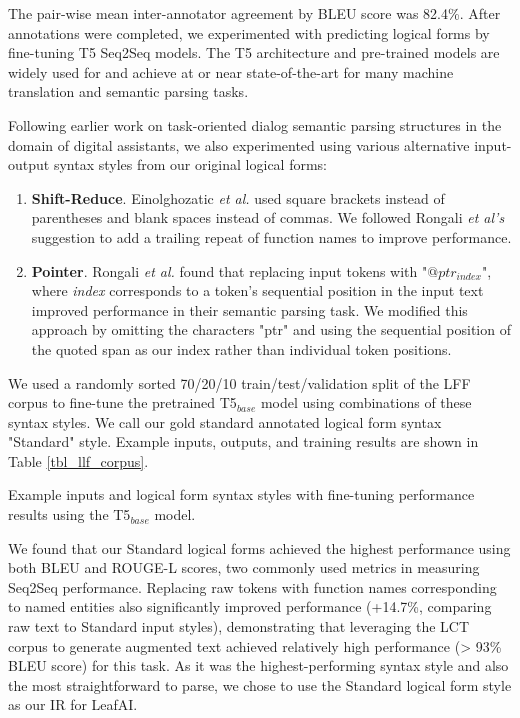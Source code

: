 \documentclass[../main.tex]{subfiles}
\begin{document}
The pair-wise mean inter-annotator agreement by BLEU score was 82.4\%. After annotations were completed, we experimented with predicting logical forms by fine-tuning T5 \cite{raffel2020exploring} Seq2Seq models. The T5 architecture and pre-trained models are widely used for and achieve at or near state-of-the-art for many machine translation and semantic parsing tasks. 

Following earlier work on task-oriented dialog semantic parsing structures in the domain of digital assistants, we also experimented using various alternative input-output syntax styles from our original logical forms:

\begin{enumerate}
    \item \textbf{Shift-Reduce}. Einolghozatic \textit{et al.} \cite{einolghozati2019improving} used square brackets instead of parentheses and blank spaces instead of commas. We followed Rongali \textit{et al's} suggestion to add a trailing repeat of function names to improve performance.
    \item \textbf{Pointer}. Rongali \textit{et al.} \cite{rongali2020don} found that replacing input tokens with "$@ptr_{index}$", where \textit{index} corresponds to a token's sequential position in the input text improved performance in their semantic parsing task. We modified this approach by omitting the characters "ptr" and using the sequential position of the quoted span as our index rather than individual token positions.
\end{enumerate}

We used a randomly sorted 70/20/10 train/test/validation split of the LFF corpus to fine-tune the pretrained T5$_{base}$ model using combinations of these syntax styles. We call our gold standard annotated logical form syntax "Standard" style. Example inputs, outputs, and training results are shown in Table \ref{tbl_llf_corpus}. 

\begin{table}[t!]
    \footnotesize
    \centering
    
    \caption{Example inputs and logical form syntax styles with fine-tuning performance results using the T5$_{base}$ model.}
    \label{tbl_llf_corpus}
\end{table} 

We found that our Standard logical forms achieved the highest performance using both BLEU \cite{lin2004rouge} and ROUGE-L \cite{ callison2006re} scores, two commonly used metrics in measuring Seq2Seq performance. Replacing raw tokens with function names corresponding to named entities also significantly improved performance (+14.7\%, comparing raw text to Standard input styles), demonstrating that leveraging the LCT corpus to generate augmented text achieved relatively high performance (> 93\% BLEU score) for this task. As it was the highest-performing syntax style and also the most straightforward to parse, we chose to use the Standard logical form style as our IR for LeafAI.
\end{document}
